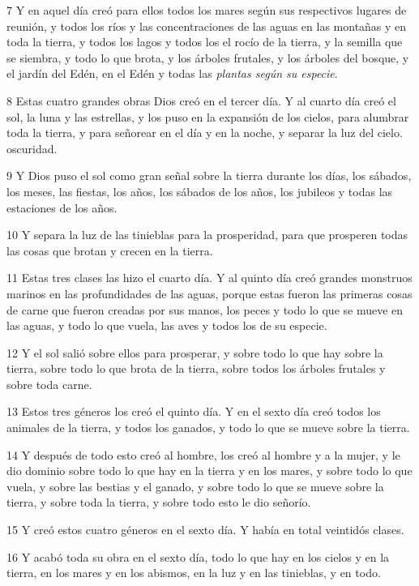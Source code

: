 \par 7 Y en aquel día creó para ellos todos los mares según sus respectivos lugares de reunión, y todos los ríos y las concentraciones de las aguas en las montañas y en toda la tierra, y todos los lagos y todos los el rocío de la tierra, y la semilla que se siembra, y todo lo que brota, y los árboles frutales, y los árboles del bosque, y el jardín del Edén, en el Edén y todas las \textit{plantas según su especie}.
\par 8 Estas cuatro grandes obras Dios creó en el tercer día. Y al cuarto día creó el sol, la luna y las estrellas, y los puso en la expansión de los cielos, para alumbrar toda la tierra, y para señorear en el día y en la noche, y separar la luz del cielo. oscuridad.
\par 9 Y Dios puso el sol como gran señal sobre la tierra durante los días, los sábados, los meses, las fiestas, los años, los sábados de los años, los jubileos y todas las estaciones de los años.
\par 10 Y separa la luz de las tinieblas para la prosperidad, para que prosperen todas las cosas que brotan y crecen en la tierra.
\par 11 Estas tres clases las hizo el cuarto día. Y al quinto día creó grandes monstruos marinos en las profundidades de las aguas, porque estas fueron las primeras cosas de carne que fueron creadas por sus manos, los peces y todo lo que se mueve en las aguas, y todo lo que vuela, las aves y todos los de su especie.
\par 12 Y el sol salió sobre ellos para prosperar, y sobre todo lo que hay sobre la tierra, sobre todo lo que brota de la tierra, sobre todos los árboles frutales y sobre toda carne.
\par 13 Estos tres géneros los creó el quinto día. Y en el sexto día creó todos los animales de la tierra, y todos los ganados, y todo lo que se mueve sobre la tierra.
\par 14 Y después de todo esto creó al hombre, los creó al hombre y a la mujer, y le dio dominio sobre todo lo que hay en la tierra y en los mares, y sobre todo lo que vuela, y sobre las bestias y el ganado, y sobre todo lo que se mueve sobre la tierra, y sobre toda la tierra, y sobre todo esto le dio señorío.
\par 15 Y creó estos cuatro géneros en el sexto día. Y había en total veintidós clases.
\par 16 Y acabó toda su obra en el sexto día, todo lo que hay en los cielos y en la tierra, en los mares y en los abismos, en la luz y en las tinieblas, y en todo.

